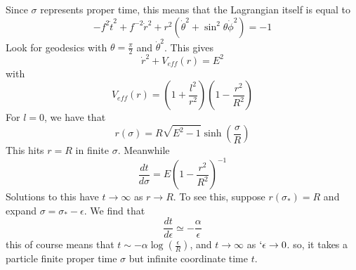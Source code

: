 Since $ \sigma  $ represents proper time, this means 
that the Lagrangian itself is equal to 
\[
 - f ^ 2 \dot{ t } ^ 2 + f ^{ - 2 } \dot{ r } ^ 2 + r ^ 2 
 ( \dot{ \theta } ^ 2 + \sin ^ 2 \theta  \dot{ \phi } ^ 2  ) = - 1  
\]
Look for geodesics with $ \theta = \frac{\pi }{ 2 } $ and $ \dot{ \theta } ^ 2  $. 
This gives 
\[
	\dot{ r } ^ 2 + V_{ eff} ( r)  = E ^ 2  
\] with 
\[
	V_{ eff }( r) = ( 1 + \frac{l ^ 2 }{ r ^ 2 } ) ( 1 - \frac{ r ^  2 }{R ^ 2  } ) 
\] For $ l  = 0 $, we have that 
\[
	r ( \sigma)  = R \sqrt{ E ^ 2 - 1}  \sinh ( \frac{ \sigma }{ R } ) 
\]  This hits $ r = R $ in finite $ \sigma $. Meanwhile 
\[
	\frac{ d t }{ d \sigma } = E \left(  1 - \frac{ r ^ 2 }{ R ^ 2 }  \right)  ^{ - 1}
\] Solutions to this have $ t \to \infty $ as $ r \to R $. 
To see this, suppose $ r ( \sigma _ * )  = R $ and expand $ \sigma = \sigma_{ * }  - \epsilon $. 
We find that 
\[
 \frac{ d t }{ d \epsilon } \simeq  - \frac{ \alpha }{ \epsilon } 
\] this of course means that $ t \sim  - \alpha \log ( \frac{ \epsilon }{ R } ) $, 
and $ t \to \infty $ as $ `\epsilon \to 0 $. 
so, it takes a particle finite proper time  $ \sigma $ but infinite 
coordinate time $ t $. 
